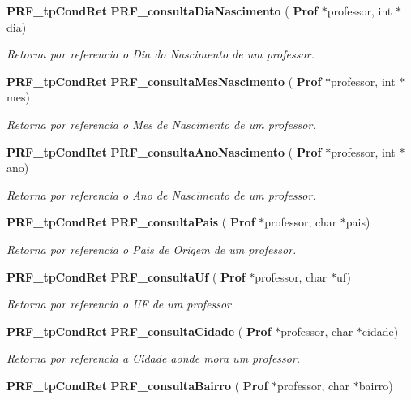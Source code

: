 \begin{DoxyCompactItemize}
\textbf{ P\+R\+F\+\_\+tp\+Cond\+Ret} \textbf{ P\+R\+F\+\_\+consulta\+Dia\+Nascimento} (\textbf{ Prof} $\ast$professor, int $\ast$dia)
\begin{DoxyCompactList}\small\item\em Retorna por referencia o Dia do Nascimento de um professor. \end{DoxyCompactList}\item 
\textbf{ P\+R\+F\+\_\+tp\+Cond\+Ret} \textbf{ P\+R\+F\+\_\+consulta\+Mes\+Nascimento} (\textbf{ Prof} $\ast$professor, int $\ast$mes)
\begin{DoxyCompactList}\small\item\em Retorna por referencia o Mes de Nascimento de um professor. \end{DoxyCompactList}\item 
\textbf{ P\+R\+F\+\_\+tp\+Cond\+Ret} \textbf{ P\+R\+F\+\_\+consulta\+Ano\+Nascimento} (\textbf{ Prof} $\ast$professor, int $\ast$ano)
\begin{DoxyCompactList}\small\item\em Retorna por referencia o Ano de Nascimento de um professor. \end{DoxyCompactList}\item 
\textbf{ P\+R\+F\+\_\+tp\+Cond\+Ret} \textbf{ P\+R\+F\+\_\+consulta\+Pais} (\textbf{ Prof} $\ast$professor, char $\ast$pais)
\begin{DoxyCompactList}\small\item\em Retorna por referencia o Pais de Origem de um professor. \end{DoxyCompactList}\item 
\textbf{ P\+R\+F\+\_\+tp\+Cond\+Ret} \textbf{ P\+R\+F\+\_\+consulta\+Uf} (\textbf{ Prof} $\ast$professor, char $\ast$uf)
\begin{DoxyCompactList}\small\item\em Retorna por referencia o UF de um professor. \end{DoxyCompactList}\item 
\textbf{ P\+R\+F\+\_\+tp\+Cond\+Ret} \textbf{ P\+R\+F\+\_\+consulta\+Cidade} (\textbf{ Prof} $\ast$professor, char $\ast$cidade)
\begin{DoxyCompactList}\small\item\em Retorna por referencia a Cidade aonde mora um professor. \end{DoxyCompactList}\item 
\textbf{ P\+R\+F\+\_\+tp\+Cond\+Ret} \textbf{ P\+R\+F\+\_\+consulta\+Bairro} (\textbf{ Prof} $\ast$professor, char $\ast$bairro)

\end{DoxyCompactItemize}
